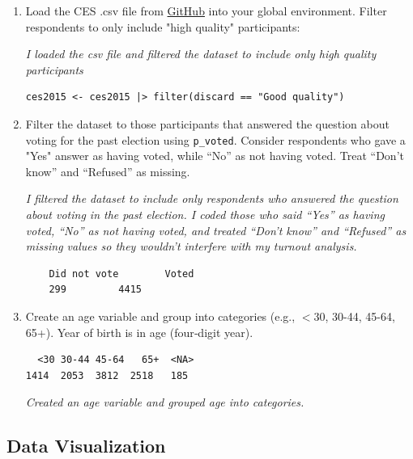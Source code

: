 \documentclass[12pt,letterpaper]{article}
\begin{document}
\begin{enumerate}
\item Load the CES .csv file from \href{https://raw.githubusercontent.com/ASDS-TCD/DataViz_2026/refs/heads/main/datasets/CES2015.csv}{GitHub} into your global environment. Filter respondents to only include "high quality" participants: 

\textit {I loaded the csv file and filtered the dataset to include only high quality participants}
\begin{verbatim}
ces2015 <- ces2015 |> filter(discard == "Good quality")
\end{verbatim}
\item Filter the dataset to those participants that answered the question about voting for the past election using \texttt{p\_voted}. Consider respondents who gave a "Yes" answer as having voted, while “No” as not having voted. Treat “Don’t know” and “Refused” as missing.


\textit {I filtered the dataset to include only respondents who answered the question about voting in the past election. I coded those who said “Yes” as having voted, “No” as not having voted, and treated “Don’t know” and “Refused” as missing values so they wouldn’t interfere with my turnout analysis.}

\begin{verbatim}
	Did not vote        Voted 
	299         4415 
\end{verbatim}



\item Create an age variable and group into categories (e.g., $<$30, 30-44, 45-64, 65+). Year of birth is in age (four‑digit year).



\begin{verbatim}
  <30 30-44 45-64   65+  <NA> 
1414  2053  3812  2518   185 
\end{verbatim}

\textit {Created an age variable and grouped age into categories.}



\end{enumerate}

\subsection*{Data Visualization}
\end{document}
